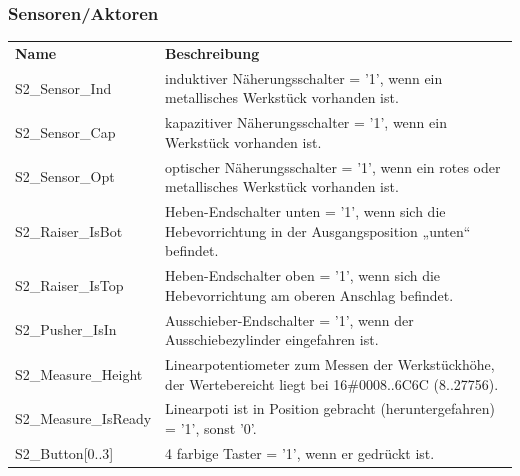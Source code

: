 \documentclass[11pt,a4paper,ngerman]{article}
\begin{document}
\subsubsection{Sensoren/Aktoren}
\begin{center}
	\setlength\extrarowheight{4pt}
	\small
	\begin{tabularx}{\textwidth}{|p{4cm}|X|}
		\hline
		\rowcolor{tublau}
		\multicolumn{2}{|c|}{\bf \color{white} \large Sensoren}\\
		\hline\hline
		\rowcolor{gray!80}
		\bf Name & \bf Beschreibung\\
		\hline\hline
		S2\_Sensor\_Ind & induktiver Näherungsschalter = '1', wenn ein metallisches Werkstück vorhanden ist.\\
		S2\_Sensor\_Cap & kapazitiver Näherungsschalter = '1', wenn ein Werkstück vorhanden ist.\\
		S2\_Sensor\_Opt & optischer Näherungsschalter = '1', wenn ein rotes oder metallisches Werkstück vorhanden ist.\\
		S2\_Raiser\_IsBot & Heben-Endschalter unten = '1', wenn sich die Hebevorrichtung in der Ausgangsposition „unten“ befindet.\\
		S2\_Raiser\_IsTop & Heben-Endschalter oben = '1', wenn sich die Hebevorrichtung am oberen Anschlag befindet.\\
		S2\_Pusher\_IsIn & Ausschieber-Endschalter = '1', wenn der Ausschiebezylinder eingefahren ist.\\
		S2\_Measure\_Height & Linearpotentiometer zum Messen der Werkstückhöhe, der Wertebereicht liegt bei 16\#0008..6C6C (8..27756).\\
		S2\_Measure\_IsReady & Linearpoti ist in Position gebracht (heruntergefahren) = '1', sonst '0'.\\
		S2\_Button[0..3] & 4 farbige Taster = '1', wenn er gedrückt ist.\\
		\hline
	\end{tabularx}
	
	\medskip
	

\end{center}
\end{document}
